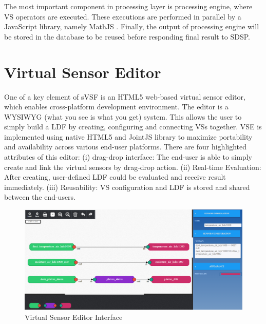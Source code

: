 The most important component in processing layer is processing engine, where VS operators are executed. These executions are performed in parallel by a JavaScript library, namely MathJS . Finally, the output of processing engine will be stored in the database to be reused before responding final result to SDSP.

\section{Virtual Sensor Editor}
One of a key element of sVSF is an HTML5 web-based virtual sensor editor, which enables cross-platform development environment. The editor is a WYSIWYG (what you see is what you get) system. This allows the user to simply build a LDF by creating, configuring and connecting VSs together. VSE is implemented using native HTML5 and JointJS  library to maximize portability and availability across various end-user platforms. There are four highlighted attributes of this editor: (i) drag-drop interface: The end-user is able to simply create and link the virtual sensors by drag-drop action. (ii) Real-time Evaluation: After creating, user-defined LDF could be evaluated and receive result immediately. (iii) Reusability: VS configuration and LDF is stored and shared between the end-users. \\

\begin{figure}[h!] 
 \begin{center} 
 \includegraphics[width=\textwidth]{./Part2/Chapter5/figures/vsf_editor_interface.png} 
    \caption{Virtual Sensor Editor Interface}
     \label{fig:c5_vsf_editor_interface}
  \end{center} 
\end{figure}

